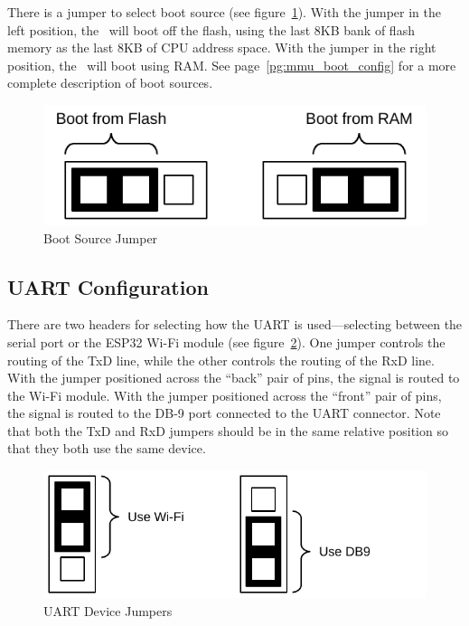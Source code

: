 There is a jumper to select boot source (see figure~\ref{fig:jmp_boot}). With the jumper in the left position, the \fjr\ will boot off the flash, using the last 8KB bank of flash memory as the last 8KB of CPU address space. With the jumper in the right position, the \fjr\ will boot using RAM. See page~\ref{pg:mmu_boot_config} for a more complete description of boot sources.

\begin{figure}[ht]
    \begin{center}
        \includegraphics[scale=0.65]{images/jumper_boot.pdf}
    \end{center}
    \caption{Boot Source Jumper}
    \label{fig:jmp_boot}
\end{figure}

\subsection*{UART Configuration}

There are two headers for selecting how the UART is used---selecting between the serial port or the ESP32 Wi-Fi module (see figure~\ref{fig:jmp_uart}). One jumper controls the routing of the TxD line, while the other controls the routing of the RxD line. With the jumper positioned across the ``back'' pair of pins, the signal is routed to the Wi-Fi module. With the jumper positioned across the ``front'' pair of pins, the signal is routed to the DB-9 port connected to the UART connector. Note that both the TxD and RxD jumpers should be in the same relative position so that they both use the same device.

\begin{figure}[ht]
    \begin{center}
        \includegraphics[scale=0.65]{images/jumper_uart.pdf}
    \end{center}
    \caption{UART Device Jumpers}
    \label{fig:jmp_uart}
\end{figure}